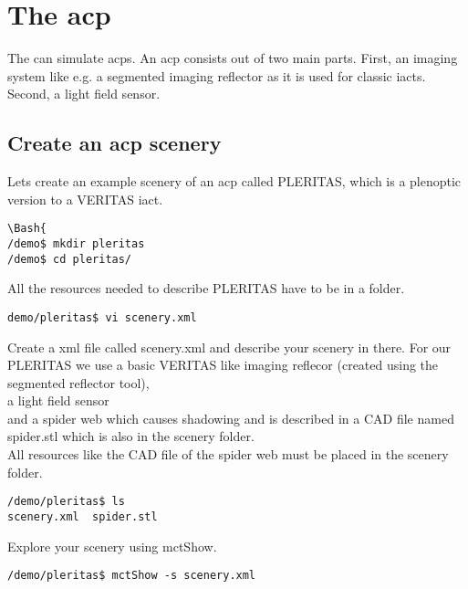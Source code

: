 \chapter{The \acf{acp}}
%
The \tool{} can simulate \acp{acp}.
%
An \ac{acp} consists out of two main parts.
%
First, an imaging system like e.g. a segmented imaging reflector as it is used for classic \acp{iact}.
%
Second, a light field sensor.
%
\section{Create an \ac{acp} scenery}
%
Lets create an example scenery of an \ac{acp} called PLERITAS, which is a plenoptic version to a VERITAS \ac{iact}.
%
\begin{lstlisting}[style=MctBash]
\Bash{
/demo$ mkdir pleritas
/demo$ cd pleritas/
\end{lstlisting}
All the resources needed to describe PLERITAS have to be in a folder.
%
\begin{lstlisting}[style=MctBash]
demo/pleritas$ vi scenery.xml
\end{lstlisting}
%
Create a xml file called scenery.xml and describe your scenery in there.
%
For our PLERITAS we use a basic VERITAS like imaging reflecor (created using the segmented reflector tool),\\
%
%
a light field sensor\\
%
%
and a spider web which causes shadowing and is described in a CAD file named spider.stl which is also in the scenery folder.\\
%
%
\newline
{}
%
%
All resources like the CAD file of the spider web must be placed in the scenery folder.
%
\begin{lstlisting}[style=MctBash]
/demo/pleritas$ ls
scenery.xml  spider.stl
\end{lstlisting}
%
Explore your scenery using mctShow.
%
\begin{lstlisting}[style=MctBash]
/demo/pleritas$ mctShow -s scenery.xml
\end{lstlisting}
%

